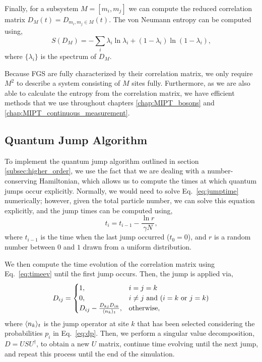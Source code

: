 Finally, for a subsystem $M = [m_i,m_j]$ we can compute the reduced correlation matrix $D_M(t) = D_{m_i,m_j\in M}(t)$. The von Neumann entropy can be computed \cite{surace2022} using,
\begin{equation}
\label{eq:vnE}
S(D_M) = -\sum\limits_{i} \lambda_i \ln\lambda_i + (1-\lambda_i)\ln(1-\lambda_i),
\end{equation}
where $\{\lambda_i\}$ is the spectrum of $D_M$. 

Because FGS are fully characterized by their correlation matrix, we only require $M^2$ to describe a system consisting of $M$ sites fully. Furthermore, as we are also able to calculate the entropy from the correlation matrix, we have efficient methods that we use throughout chapters \ref{chap:MIPT_bosons} and \ref{chap:MIPT_continuous_measurement}.

\subsection{Quantum Jump Algorithm}

To implement the quantum jump algorithm outlined in section \ref{subsec:higher_order}, we use the fact that we are dealing with a number-conserving Hamiltonian, which allows us to compute the times at which quantum jumps occur explicitly. Normally, we would need to solve Eq.~\ref{eq:jumptime} numerically; however, given the total particle number, we can solve this equation explicitly, and the jump times can be computed using, 
\begin{equation}
    t_{i} = t_{i-1} - \frac{\ln{r}}{\gamma N},
\end{equation}
where $t_{i-1}$ is the time when the last jump occurred ($t_0 = 0$), and $r$ is a random number between $0$ and $1$ drawn from a uniform distribution.

We then compute the time evolution of the correlation matrix using Eq.~\ref{eq:timeev} until the first jump occurs. Then, the jump is applied via, 
\begin{equation}
  D_{ij} =
    \begin{cases}
      1, & i = j = k\\
      0, & i \neq j \text{ and } (i = k \text{ or } j = k)\\
      D_{ij} - \frac{D_{kj}D_{ik}}{\langle n_k\rangle_t}, & \text{otherwise},
    \end{cases}       
\end{equation}
where $\langle n_k\rangle_t$ is the jump operator at site $k$ that has been selected considering the probabilities $p_i$ in Eq.~\ref{eq:dp}. Then, we perform a singular value decomposition, $D = U S U^\dagger$, to obtain a new $U$ matrix, continue time evolving until the next jump, and repeat this process until the end of the simulation.

